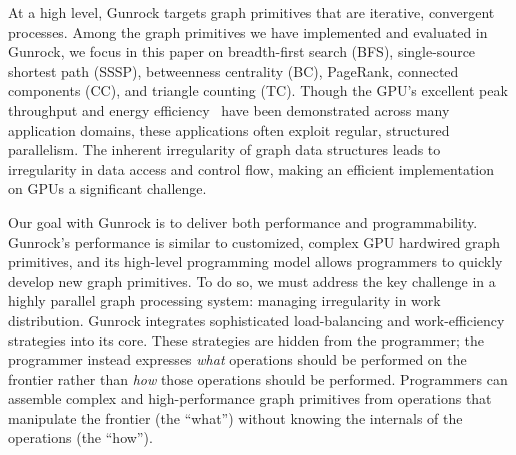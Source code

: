 \documentclass[format=acmsmall,review=false,screen=true]{acmart}
\begin{document}
At a high level, Gunrock targets graph primitives that are iterative,
convergent processes. Among the graph primitives we have implemented
and evaluated in Gunrock, we focus in this paper on breadth-first
search (BFS), single-source shortest path (SSSP), betweenness
centrality (BC), PageRank, connected components (CC), and triangle
counting (TC). Though the GPU's excellent peak throughput and energy
efficiency~\cite{Keckler:2011:GAT} have been demonstrated across many
application domains, these applications often exploit regular,
structured parallelism. The inherent irregularity of graph data
structures leads to irregularity in data access and control flow,
making an efficient implementation on GPUs a significant challenge.

Our goal with Gunrock is to deliver both performance and
programmability. Gunrock's performance is similar to customized,
complex GPU hardwired graph primitives, and its high-level programming
model allows programmers to quickly develop new graph primitives. To
do so, we must address the key challenge in a highly parallel graph
processing system: managing irregularity in work distribution. Gunrock
integrates sophisticated load-balancing and work-efficiency strategies
into its core. These strategies are hidden from the programmer; the
programmer instead expresses \emph{what} operations should be
performed on the frontier rather than \emph{how} those operations
should be performed. Programmers can assemble complex and
high-performance graph primitives from operations that manipulate the
frontier (the ``what'') without knowing the internals of the
operations (the ``how'').
\end{document}
